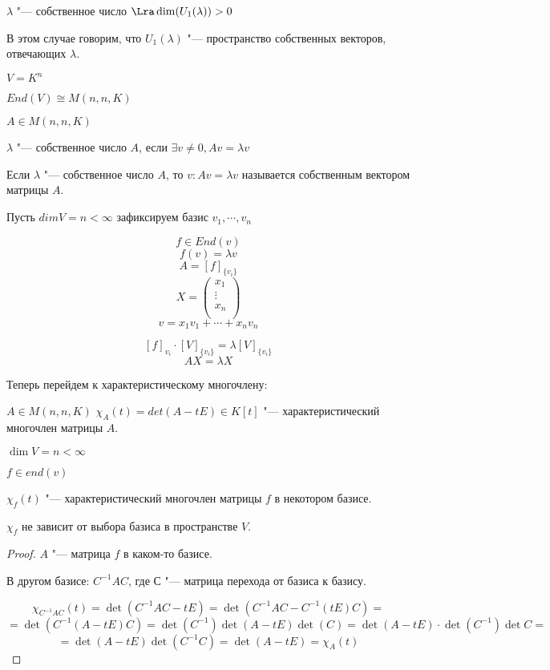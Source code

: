 $\lambda$ "--- собственное число $\Lra \dim(U_1(\lambda)) > 0$

В этом случае говорим, что $U_1(\lambda)$ "--- пространство собственных
векторов, отвечающих $\lambda$.

$V = K^{n}$ 

$End(V) \cong M(n, n, K)$

$A \in M(n, n, K)$ 

$\lambda$ "--- собственное число $A$, если $\exists v \ne 0,  Av = \lambda v$
                                                     
Если $\lambda$ "--- собственное число $A$, то $v\colon Av = \lambda v$ называется
собственным вектором матрицы $A$.

Пусть $dim V = n < \infty$
зафиксируем базис $v_1, \cdots, v_n$

$$f \in End(v)$$
$$f(v) = \lambda v$$
$$A = [f]_{\{v_i\}}$$
$$
X = \begin{pmatrix}
x_1\\
\vdots\\
x_n\\
\end{pmatrix}
$$
$$v = x_1v_1 + \cdots + x_nv_n $$

$$[f]_{v_i}\cdot[V]_{\{v_i\}} = \lambda[V]_{\{v_i\}}$$
$$AX = \lambda X$$


\begin{Def}
Теперь перейдем к характеристическому многочлену:

$A \in M(n, n, K)$
$\chi_{A}(t) = det(A - tE) \in K[t]$ "--- характеристический многочлен матрицы $A$.

$\dim V = n < \infty$

$f \in end(v)$

$\chi_{f}(t)$ "--- характеристический многочлен матрицы $f$ в некотором базисе.
\end{Def}

\begin{Rem}
$\chi_f$ не зависит от выбора базиса в пространстве $V$.
\end{Rem}
\begin{proof}
$A$ "--- матрица $f$ в каком-то базисе.

В другом базисе: $C^{-1}AC$, где $С$ "--- матрица перехода от базиса к базису.

$$\chi_{C^{-1}AC}(t) = \det(C^{-1}AC - tE) = \det(C^{-1}AC - C^{-1}(tE)C) = $$
$$ = \det(C^{-1}(A - tE)C) = \det(C^{-1})\det(A - tE)\det(C) = \det(A - tE)\cdot\det(C^{-1})\det C =  $$
$$= \det(A - tE)\det(C^{-1}C) = \det(A - tE) = \chi_{A}(t) $$

\end{proof}

